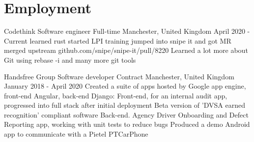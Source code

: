 \documentclass{my_cv}
\begin{document}
\section{Employment}

\workDetails
{Codethink}
{Software engineer}
{Full-time}
{Manchester, United Kingdom}
{April 2020 - Current}
\workdetails
{learned rust}
{started LPI training}
{jumped into snipe it and got MR merged upstream github.com/snipe/snipe-it/pull/8220}
{Learned a lot more about Git using  rebase -i and many more git tools}
\stopworkdetails


\workDetails
{Handsfree Group}
{Software developer}
{Contract} %
{Manchester, United Kingdom}
{January 2018 - April 2020}
\workdetails
{Created a suite of apps hosted by Google app engine, front-end Angular, back-end Django:}
{Front-end, for an internal audit app, progressed into full stack after initial deployment}
{Beta version of 'DVSA earned recognition' compliant software }
{Back-end. Agency Driver Onboarding and Defect Reporting app, working with unit tests to reduce bugs}
{Produced a demo Android app to communicate with a Pietel PTCarPhone}%
\stopworkdetails
\end{document}
